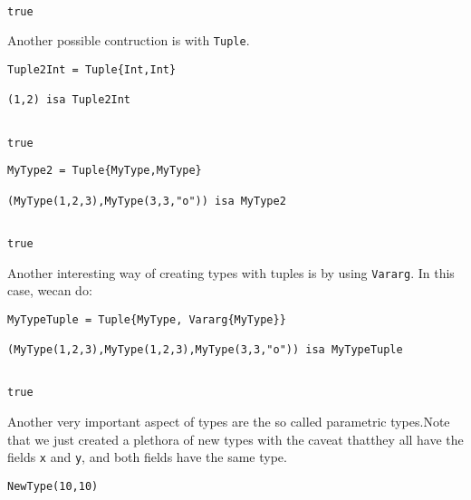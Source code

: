\begingroup

\fontsize{10pt}{12pt}\selectfont

\begin{verbatim}

true
\end{verbatim}

\endgroup
Another possible contruction is with \lstinline[style=julia]{Tuple}.
\bigskip
\begin{lstlisting}[language=JuliaLocal, style=julia, texcl=true]
Tuple2Int = Tuple{Int,Int}

(1,2) isa Tuple2Int
\end{lstlisting}

\begingroup

\fontsize{10pt}{12pt}\selectfont

\begin{verbatim}

true
\end{verbatim}

\endgroup

\bigskip
\begin{lstlisting}[language=JuliaLocal, style=julia, texcl=true]
MyType2 = Tuple{MyType,MyType}

(MyType(1,2,3),MyType(3,3,"o")) isa MyType2
\end{lstlisting}

\begingroup

\fontsize{10pt}{12pt}\selectfont

\begin{verbatim}

true
\end{verbatim}

\endgroup
Another interesting way of creating types with tuples is by using \lstinline[style=julia]{Vararg}. In this case, wecan do:
\bigskip
\begin{lstlisting}[language=JuliaLocal, style=julia, texcl=true]
MyTypeTuple = Tuple{MyType, Vararg{MyType}}

(MyType(1,2,3),MyType(1,2,3),MyType(3,3,"o")) isa MyTypeTuple
\end{lstlisting}

\begingroup

\fontsize{10pt}{12pt}\selectfont

\begin{verbatim}

true
\end{verbatim}

\endgroup
Another very important aspect of types are the so called parametric types.Note that we just created a plethora of new types with the caveat thatthey all have the fields \lstinline[style=julia]{x} and \lstinline[style=julia]{y}, and both fields have the same type.
\bigskip
\begin{lstlisting}[language=JuliaLocal, style=julia, texcl=true]
NewType(10,10)
\end{lstlisting}

